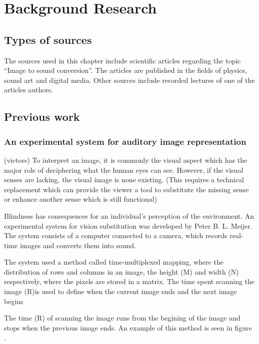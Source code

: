 \chapter{Background Research}\label{ch:bgresearch}



\section{Types of sources}\label{sec:typesofsources} 
The sources used in this chapter include scientific articles regarding the topic “Image to sound conversion”. The articles are published in the fields of physics, sound art and digital media. Other sources include recorded lectures of one of the articles authors.

\section{Previous work}\label{sec:previouswork}

\subsection{An experimental system for auditory image representation}\label{sec:experimentalsystem}
(victors) To interpret an image, it is commonly the visual aspect which has the major role of deciphering what the human eyes can see. However, if the visual senses are lacking, the visual image is none existing. (This requires a technical replacement which can provide the viewer a tool to substitute the missing sense or enhance another sense which is still functional) 

Blindness has consequences for an individual's perception of the environment. An experimental system for vision substitution was developed by Peter B. L. Meijer. The system consists of a computer connected to a camera, which records real-time images and converts them into sound. 

The system used a method called time-multiplexed mapping, where the distribution of rows and columns in an image, the height (M) and width (N) respectively, where the pixels are stored in a matrix. The time spent scanning the image (R)is used to define when the current image ends and the next image begins


The time (R) of scanning the image runs from the begining of the image and stops when the previous image ends. An example of this method is seen in figure . 

